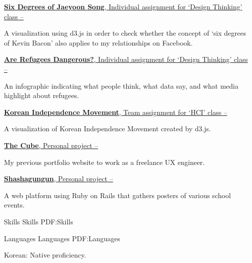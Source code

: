 \documentclass[letterpaper,MMMyyyy,nonstopmode]{template}
\begin{document}
\begin{Body}
\BigGap
\Entry
  \href{https://jaeyoon.io/dt4c}
  {\textbf{Six Degrees of Jaeyoon Song}, {\small{Individual assignment for `Design Thinking' class}}
  \hfill
   --
  }

  \begin{Detail}
  \SubBulletItem
    A visualization using d3.js in order to check whether the concept of `six degrees of Kevin Bacon' also applies to my relationships on Facebook.
  \end{Detail}

\BigGap
\Entry
  \href{https://jaeyoon.io/dt4c}
  {\textbf{Are Refugees Dangerous?}, {\small{Individual assignment for `Design Thinking' class}}
  \hfill
   --
  }

  \begin{Detail}
  \SubBulletItem
    An infographic indicating what people think, what data say, and what media highlight about refugees. 
  \end{Detail}

\BigGap
\Entry
  \href{https://jaeyoon.io/infovis}
  {\textbf{Korean Independence Movement}, {\small{Team assignment for `HCI' class}}
  \hfill
   --
  }
  \begin{Detail}
    \SubBulletItem
      A visualization of Korean Independence Movement created by d3.js.
  \end{Detail}

\BigGap
\Entry
  \href{https://jaeyoon.io}
  {\textbf{The Cube}, {\small{Personal project}}
  \hfill
   --
  }
  \begin{Detail}
    \SubBulletItem
      My previous portfolio website to work as a freelance UX engineer.
  \end{Detail}


\BigGap
\Entry
  \href{http://shashagungun.com}
  {\textbf{Shashagungun}, {\small{Personal project}}
  \hfill
   --
  }
  \begin{Detail}
    \SubBulletItem
      A web platform using Ruby on Rails that gathers posters of various school events.
  \end{Detail}


\BigGap
\Section
{Skills}
{Skills}
{PDF:Skills}

\SubSection
{Languages}
{Languages}
{PDF:Languages}

\BigGap
\BulletItem
Korean: Native proficiency.


\end{Body}
\end{document}
